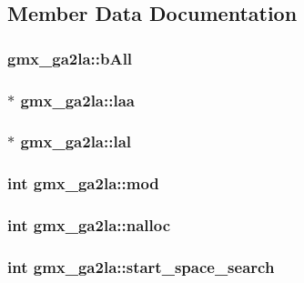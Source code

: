 \subsection{\-Member \-Data \-Documentation}
\hypertarget{structgmx__ga2la_a03196e17ef59a80743c6937ed2a70fa4}{
\subsubsection[{b\-All}]{ {\bf gmx\-\_\-ga2la\-::b\-All}}}\label{structgmx__ga2la_a03196e17ef59a80743c6937ed2a70fa4}
\hypertarget{structgmx__ga2la_a7dd6309c7305c6ae325c1d52d17ba600}{
\subsubsection[{laa}]{ $\ast$ {\bf gmx\-\_\-ga2la\-::laa}}}\label{structgmx__ga2la_a7dd6309c7305c6ae325c1d52d17ba600}
\hypertarget{structgmx__ga2la_a92b7d8241c3c9fc9f325fe468ec9bb66}{
\subsubsection[{lal}]{ $\ast$ {\bf gmx\-\_\-ga2la\-::lal}}}\label{structgmx__ga2la_a92b7d8241c3c9fc9f325fe468ec9bb66}
\hypertarget{structgmx__ga2la_a6ea82b1614fae9a7348931f91d4cbd1c}{
\subsubsection[{mod}]{\setlength{\rightskip}{0pt plus 5cm}int {\bf gmx\-\_\-ga2la\-::mod}}}\label{structgmx__ga2la_a6ea82b1614fae9a7348931f91d4cbd1c}
\hypertarget{structgmx__ga2la_a2fc212a6fe9ebfdaa46de445c9de58ea}{
\subsubsection[{nalloc}]{\setlength{\rightskip}{0pt plus 5cm}int {\bf gmx\-\_\-ga2la\-::nalloc}}}\label{structgmx__ga2la_a2fc212a6fe9ebfdaa46de445c9de58ea}
\hypertarget{structgmx__ga2la_ace52eb5ca70dde273e46d5465d15d9cd}{
\subsubsection[{start\-\_\-space\-\_\-search}]{\setlength{\rightskip}{0pt plus 5cm}int {\bf gmx\-\_\-ga2la\-::start\-\_\-space\-\_\-search}}}\label{structgmx__ga2la_ace52eb5ca70dde273e46d5465d15d9cd}


